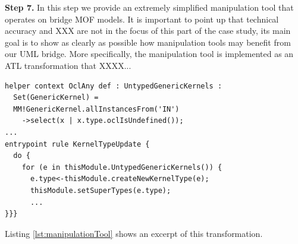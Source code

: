 \textbf{Step 7.} In this step we provide an extremely simplified manipulation tool that operates on bridge MOF models. 
It is important to point up that technical accuracy and XXX are not in the focus of this part of the case study, 
its main goal is to show as clearly as possible how manipulation tools may benefit from our UML bridge. 
More specifically, the manipulation tool is implemented as an ATL transformation that XXXX...
%
\begin{lstlisting}[breaklines,style=AMMA,language=ATL,mathescape,rulesepcolor=\color{black},caption=ATL transformation working on MOF-based SysML models,captionpos=b,label={lst:manipulationTool}]
helper context OclAny def : UntypedGenericKernels : 
  Set(GenericKernel) = 
  MM!GenericKernel.allInstancesFrom('IN')
    ->select(x | x.type.oclIsUndefined());
...
entrypoint rule KernelTypeUpdate {
  do {
    for (e in thisModule.UntypedGenericKernels()) {
      e.type<-thisModule.createNewKernelType(e);
      thisModule.setSuperTypes(e.type);
      ...
}}}
\end{lstlisting}

Listing \ref{lst:manipulationTool} shows an excerpt of this transformation. 




